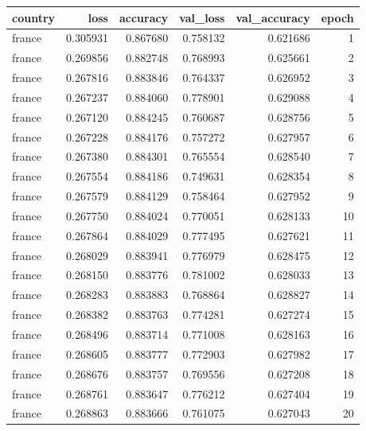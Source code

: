 \begin{tabular}{lrrrrr}
\toprule
country & loss & accuracy & val_loss & val_accuracy & epoch \\
\midrule
france & 0.305931 & 0.867680 & 0.758132 & 0.621686 & 1 \\
france & 0.269856 & 0.882748 & 0.768993 & 0.625661 & 2 \\
france & 0.267816 & 0.883846 & 0.764337 & 0.626952 & 3 \\
france & 0.267237 & 0.884060 & 0.778901 & 0.629088 & 4 \\
france & 0.267120 & 0.884245 & 0.760687 & 0.628756 & 5 \\
france & 0.267228 & 0.884176 & 0.757272 & 0.627957 & 6 \\
france & 0.267380 & 0.884301 & 0.765554 & 0.628540 & 7 \\
france & 0.267554 & 0.884186 & 0.749631 & 0.628354 & 8 \\
france & 0.267579 & 0.884129 & 0.758464 & 0.627952 & 9 \\
france & 0.267750 & 0.884024 & 0.770051 & 0.628133 & 10 \\
france & 0.267864 & 0.884029 & 0.777495 & 0.627621 & 11 \\
france & 0.268029 & 0.883941 & 0.776979 & 0.628475 & 12 \\
france & 0.268150 & 0.883776 & 0.781002 & 0.628033 & 13 \\
france & 0.268283 & 0.883883 & 0.768864 & 0.628827 & 14 \\
france & 0.268382 & 0.883763 & 0.774281 & 0.627274 & 15 \\
france & 0.268496 & 0.883714 & 0.771008 & 0.628163 & 16 \\
france & 0.268605 & 0.883777 & 0.772903 & 0.627982 & 17 \\
france & 0.268676 & 0.883757 & 0.769556 & 0.627208 & 18 \\
france & 0.268761 & 0.883647 & 0.776212 & 0.627404 & 19 \\
france & 0.268863 & 0.883666 & 0.761075 & 0.627043 & 20 \\
\bottomrule
\end{tabular}
